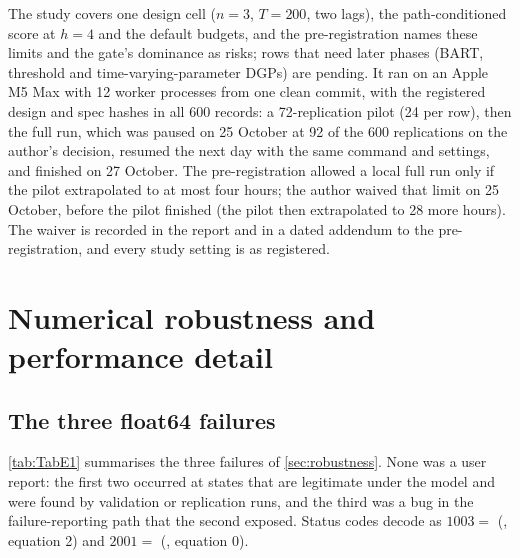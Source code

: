 The study covers one design cell ($n = 3$, $T = 200$, two lags), the path-conditioned score at
$h = 4$ and the default budgets, and the pre-registration names these limits and the gate's
dominance as risks; rows that need later phases (BART, threshold and time-varying-parameter DGPs) are
pending. It ran on an Apple M5 Max with 12 worker processes from one clean commit, with the
registered design and spec hashes in all 600 records: a 72-replication pilot (24 per row), then the
full run, which was paused on 25 October at 92 of the 600 replications on the author's decision,
resumed the next day with the same command and settings, and finished on 27 October. The
pre-registration allowed a local full run only if the pilot extrapolated to at most four hours; the
author waived that limit on 25 October, before the pilot finished (the pilot then extrapolated to 28
more hours). The waiver is recorded in the report and in a dated addendum to the pre-registration,
and every study setting is as registered.

\section{Numerical robustness and performance detail}\label{app:numerics}

\subsection{The three float64 failures}\label{app:float64}

\cref{tab:TabE1} summarises the three failures of \cref{sec:robustness}.
None was a user report: the first two occurred at states that are legitimate under the model and
were found by validation or replication runs, and the third was a bug in the failure-reporting path
that the second exposed.
Status codes decode as $1003 = $ (, equation 2) and $2001 = $ (,
equation 0).

